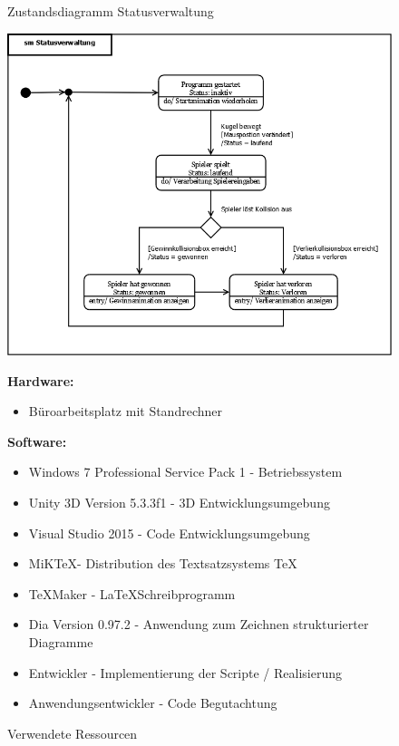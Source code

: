 \begin{figure}[H]
\centering
\label{Abb:SMStatus}
\caption{Zustandsdiagramm Statusverwaltung}
\includegraphics[scale=0.35]{Bilder/Diagramme/smStatusverwaltung.png}

\raggedright
\caption{Verwendete Ressourcen}
\label{Abb:Ressourcen}
\textbf{Hardware:}
\begin{itemize}
\item Büroarbeitsplatz mit Standrechner
\end{itemize}
\textbf{Software:}
\begin{itemize}
\item Windows 7 Professional Service Pack 1 - Betriebssystem
\item Unity 3D Version 5.3.3f1 - 3D Entwicklungsumgebung
\item Visual Studio 2015 - Code Entwicklungsumgebung
\item MiK\TeX - Distribution des Textsatzsystems \TeX
\item \TeX{}Maker - \LaTeX Schreibprogramm
\item Dia Version 0.97.2 - Anwendung zum Zeichnen strukturierter Diagramme
\end{itemize}
\begin{itemize}
\item Entwickler - Implementierung der Scripte / Realisierung
\item Anwendungsentwickler - Code Begutachtung
\end{itemize}
\end{figure}



